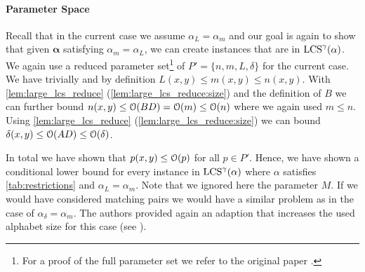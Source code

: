 






\paragraph*{Parameter Space}
Recall that in the current case we assume $\alpha_L = \alpha_m$ and our goal is again to show that given $\mathbf{\alpha}$ satisfying $\alpha_m = \alpha_L$, we can create instances that are in $\text{LCS}^\gamma(\mathbf{\alpha})$.
We again use a reduced parameter set\footnote{For a proof of the full parameter set we refer to the original paper \cite[section 9.2.2]{Bringman.2018}.} of $P' = \{n, m, L, \delta\}$ for the current case.
We have trivially and by definition $L(x,y) \leq m(x,y) \leq n(x,y)$.
With \autoref{lem:large_lcs_reduce} (\ref{lem:large_lcs_reduce:size}) and the definition of $B$ we can further bound $n(x,y) \leq \mathcal{O}(BD) = \mathcal{O}(m) \leq \mathcal{O}(n)$ where we again used $m \leq n$.
Using \autoref{lem:large_lcs_reduce} (\ref{lem:large_lcs_reduce:size}) we can bound $\delta(x,y) \leq \mathcal{O}(AD) \leq \mathcal{O}(\delta)$.

In total we have shown that $p(x,y) \leq \mathcal{O}(p)$ for all $p \in P'$.
Hence, we have shown a conditional lower bound for every instance in $\text{LCS}^\gamma(\mathbb{\alpha})$ where $\mathbb{\alpha}$ satisfies \autoref{tab:restrictions} and $\alpha_L = \alpha_m$.
%
Note that we ignored here the parameter $M$.
If we would have considered matching pairs we would have a similar problem as in the case of $\alpha_\delta = \alpha_m$.
The authors provided again an adaption that increases the used alphabet size for this case (see \cite[Section 9.2.3]{Bringman.2018}).